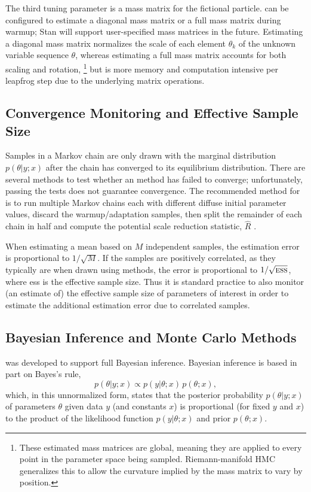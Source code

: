 The third tuning parameter is a mass matrix for the fictional
particle.  \Stan can be configured to estimate a diagonal mass matrix
or a full mass matrix during warmup; Stan will support user-specified
mass matrices in the future.  Estimating a diagonal mass matrix
normalizes the scale of each element $\theta_k$ of the unknown
variable sequence $\theta$, whereas estimating a full mass matrix
accounts for both scaling and rotation,%
%
\footnote{These estimated mass matrices are global, meaning they are
  applied to every point in the parameter space being sampled.
  Riemann-manifold HMC generalizes this to allow the curvature implied
  by the mass matrix to vary by position.}
%
but is more memory and computation intensive per leapfrog step due to
the underlying matrix operations.

\subsection{Convergence Monitoring and Effective Sample Size}

Samples in a Markov chain are only drawn with the marginal
distribution $p(\theta|y;x)$ after the chain has converged to its
equilibrium distribution.  There are several methods to test whether
an \MCMC method has failed to converge; unfortunately, passing the
tests does not guarantee convergence.  The recommended method for
\Stan is to run multiple Markov chains each with different diffuse
initial parameter values, discard the warmup/adaptation samples, then
split the remainder of each chain in half and compute the potential
scale reduction statistic, $\hat{R}$ \citep{GelmanRubin:1992}.

When estimating a mean based on $M$ independent samples, the
estimation error is proportional to $1/\sqrt{M}$.  If the samples are
positively correlated, as they typically are when drawn using \MCMC
methods, the error is proportional to $1/\sqrt{\mbox{\sc ess}}$, where
{\sc ess} is the effective sample size.  Thus it is standard practice
to also monitor (an estimate of) the effective sample size of
parameters of interest in order to estimate the additional estimation
error due to correlated samples.

\subsection{Bayesian Inference and Monte Carlo Methods}

\Stan was developed to support full Bayesian inference.  Bayesian
inference is based in part on Bayes's rule,
\[
p(\theta|y;x) \propto p(y|\theta;x) \, p(\theta;x),
\]
which, in this unnormalized form, states that the posterior
probability $p(\theta|y;x)$ of parameters $\theta$ given data $y$ (and
constants $x$) is proportional (for fixed $y$ and $x$) to the
product of the likelihood function $p(y|\theta;x)$ and prior
$p(\theta;x)$.

